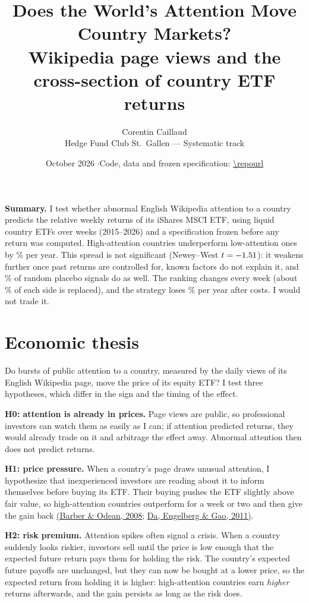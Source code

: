\documentclass[11pt,a4paper]{article}
\title{\vspace{-1.5cm}\textbf{Does the World's Attention Move Country Markets?}\\[2pt]
\large Wikipedia page views and the cross-section of country ETF returns}
\author{Corentin Caillaud \\ \small Hedge Fund Club St.\ Gallen --- Systematic track}
\date{\small October 2026 \quad$\cdot$\quad Code, data and frozen specification: \url{\repourl}}
\DeclareRobustCommand{\refto}[2]{\hyperlink{ref:#1}{#2}}
\begin{document}
\maketitle
\vspace{-0.6cm}

\noindent\textbf{Summary.}
I test whether abnormal English Wikipedia attention to a country predicts the relative weekly
returns of its iShares MSCI ETF, using \NEtfs{} liquid country ETFs over \NWeeks{} weeks
(2015--2026) and a specification frozen before any return was computed. High-attention
countries underperform low-attention ones by \LSLoss\% per year. This spread is not significant
(Newey--West $t=-1.51$): it weakens further once past returns are controlled for, known factors do not
explain it, and \PlaceboPct\% of random placebo signals do as well.
The ranking changes every week (about \TurnoverPerSide\% of each side is replaced), and
the strategy loses \NetLoss\% per year after costs. I would not trade it.

\section{Economic thesis}
Do bursts of public attention to a country, measured by the daily views of its English Wikipedia
page, move the price of its equity ETF? I test three
hypotheses, which differ in the sign and the timing of the effect.

\textbf{H0: attention is already in prices.} Page views are public, so professional investors can
watch them as easily as I can; if attention predicted returns, they would already trade on it and
arbitrage the effect away. Abnormal attention then does not predict returns.

\textbf{H1: price pressure.} When a country's page draws unusual attention, I hypothesize
that inexperienced investors are reading about it to inform themselves before buying its ETF. Their buying pushes the ETF slightly
above fair value, so high-attention countries outperform for a week or two and then give the gain
back \refto{barber2008}{(Barber \& Odean, 2008}; \refto{da2011}{Da, Engelberg \& Gao, 2011)}.

\textbf{H2: risk premium.} Attention spikes often signal a crisis. When a country suddenly looks
riskier, investors sell until the price is low enough that the expected future return pays them for
holding the risk. The country's expected future payoffs are unchanged, but they can now be bought
at a lower price, so the expected return from holding it is higher: high-attention countries earn
\emph{higher} returns afterwards, and the gain persists as long as the risk does.
\end{document}

